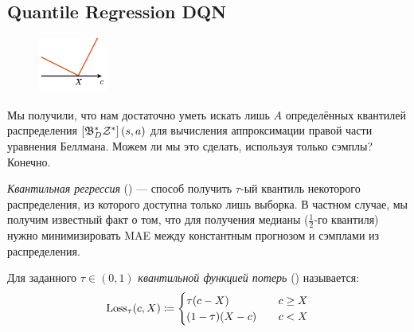 \subsection{Quantile Regression DQN}\label{subsec:qrdqn}

\begin{figure}
\vspace{-0.5cm}
\centering
\includegraphics[width=0.2\textwidth]{Images/quantileloss.png}
\vspace{-1.2cm}
\end{figure}

Мы получили, что нам достаточно уметь искать лишь $A$ определённых квантилей распределения $\left[ \mathfrak{B}^*_D \mathcal{Z}^* \right](s, a)$ для вычисления аппроксимации правой части уравнения Беллмана. Можем ли мы это сделать, используя только сэмплы? Конечно. 

\emph{Квантильная регрессия} () --- способ получить $\tau$-ый квантиль некоторого распределения, из которого доступна только лишь выборка. В частном случае, мы получим известный факт о том, что для получения медианы ($\frac{1}{2}$-го квантиля) нужно минимизировать MAE между константным прогнозом и сэмплами из распределения.

\begin{definition}
Для заданного $\tau \in (0, 1)$ \emph{квантильной функцией потерь} () называется:
\begin{equation}\label{quantileloss}
\operatorname{Loss}_{\tau}(c, X) \coloneqq \begin{cases}
\tau (c - X) \quad &c \ge X \\
(1 - \tau) (X - c) \quad &c < X \\
\end{cases}
\end{equation}
\end{definition}

